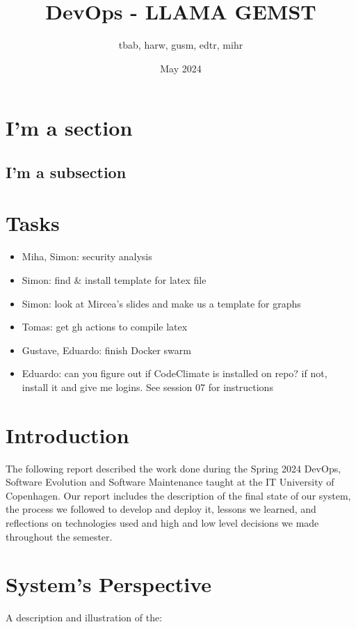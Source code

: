 \documentclass{article}
\title{DevOps - LLAMA GEMST}
\author{tbab, harw, gusm, edtr, mihr}
\date{May 2024}
\begin{document}
\maketitle

\section{I'm a section}
\subsection{I'm a subsection}

\section{Tasks}

\begin{itemize}
  \item Miha, Simon: security analysis
  \item Simon: find \& install template for latex file
  \item Simon: look at Mircea's slides and make us a template for graphs
  \item Tomas: get gh actions to compile latex
  \item Gustave, Eduardo: finish Docker swarm
  \item Eduardo: can you figure out if CodeClimate is installed on repo? if not, install it and give me logins. See session 07 for instructions
\end{itemize}

\section{Introduction}
The following report described the work done during the Spring 2024 DevOps, Software Evolution and Software Maintenance taught at the IT University of Copenhagen. Our report includes the description of the final state of our system, the process we followed to develop and deploy it, lessons we learned, and reflections on technologies used and high and low level decisions we made throughout the semester.

\section{System's Perspective}

A description and illustration of the:
\end{document}
